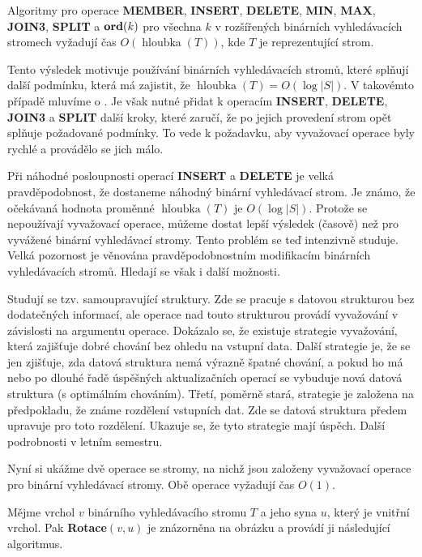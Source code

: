 \documentclass[a4paper,12pt]{article}
\def \emph#1{\underbar{#1}}
\DeclareMathOperator*{\hloubka}{hloubka}
\begin{document}
\begin{veta}Algoritmy pro operace {\bf MEMBER}, {\bf INSERT}, {\bf DE\-LE\-TE}, {\bf MIN}, {\bf MAX}, 
{\bf JOIN3}, {\bf SPLIT} a $\bold o\bold r\bold d(k)$ pro všechna $
k$ v rozšířených binár\-ních 
vy\-hledávacích stromech vyžadují čas $O(\hloubka
(T))$, kde $T$ je 
reprezentující strom. 
\end{veta}

Tento výsledek motivuje používání binárních 
vyhledávacích stromů, které splňují další 
podmínku, která má zajistit, že 
$\hloubka(T)=O(\log|S|)$.  V takovémto případě mluvíme o 
\emph{vyvážených} \emph{binárních} 
\emph{vyhledávacích} \emph{stromech}.  Je však nutné 
přidat k ope\-racím {\bf INSERT}, {\bf DELETE}, {\bf JOIN3} a {\bf SPLIT} další 
kroky, které 
zaručí, že po jejich provedení strom opět splňuje 
požadované podmínky.  To vede k požadavku, aby 
vyvažovací operace byly rychlé a provádělo se jich málo.  

Při náhodné posloupnosti operací {\bf INSERT} a {\bf DELETE} je 
velká pravděpodobnost, že dostaneme náhodný binární 
vy\-hledávací strom.  Je známo, že očekávaná hodnota proměn\-né 
$\hloubka(T)$ je $O(\log|S|)$.  Protože se nepoužívají vyvažovací 
operace, můžeme dostat lepší výsledek (časově) než pro 
vyvá\-žené binár\-ní vyhledávací stromy.  Tento problém se teď 
intenzivně studu\-je.  Velká pozornost je věnována 
pravděpodobnost\-ním modifikacím binárních vyhledávacích 
stromů.  Hledají se však i další možnosti.  

Studují se tzv.  samoupravující struktury.  Zde se 
pracuje s datovou strukturou bez dodatečných informací, ale 
operace nad touto strukturou provádí vyvažování v závislosti 
na argumentu operace.  Dokázalo se, že existuje strategie 
vyvažování, která zajišťuje dobré chování bez ohledu na 
vstupní data.  Další strategie je, že se jen zjišťuje, zda datová 
struktura nemá výraz\-ně špatné chování, a pokud ho má nebo 
po dlouhé řadě úspěš\-ných aktualizačních operací se vybuduje 
nová datová struktura (s optimálním chováním).  Třetí, 
poměrně stará, strategie je zalo\-že\-na na předpokladu, že 
známe rozdělení vstupních dat.  Zde se datová struktura 
předem upravuje pro toto rozdělení.  Ukazuje se, že tyto 
strategie mají úspěch.  Další podrobnosti v letním semestru.  

Nyní si ukážme dvě operace se stromy, na nichž jsou 
založeny  vyvažovací operace pro binární vyhledávací 
stromy. Obě ope\-race vyžadují čas $O(1)$.

Mějme vrchol $v$ binárního vyhledávacího stromu $
T$ a 
jeho syna $u$, který je vnitřní vrchol.  Pak {\bf Rotace$
(v,u)$} je 
znázorněna na obrázku a provádí ji následující algoritmus.  
\end{document}
